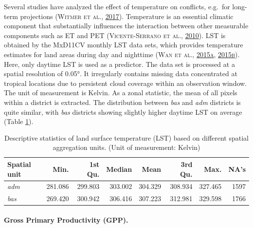 \documentclass[a4paper,11pt]{article}
\begin{document}
Several studies have analyzed the effect of temperature on conflicts, e.g.~for
long-term projections \textsc{(\textnormal{\textsc{Witmer} \textsc{et al.}}, \textnormal{\protect\hyperlink{ref-witmer2017}{2017}})}. Temperature is an essential climatic component
that substantially influences the interaction between other measurable components
such as ET and PET \textsc{(\textnormal{\textsc{Vicente-Serrano} \textsc{et al.}}, \textnormal{\protect\hyperlink{ref-vicente2010}{2010}})}. LST is obtained by the MxD11CV
monthly LST data sets, which provides temperature estimates for land areas
during day and nighttime \textsc{(\textnormal{\textsc{Wan} \textsc{et al.}}, \textnormal{\protect\hyperlink{ref-wanzhengming2015}{2015}\protect\hyperlink{ref-wanzhengming2015}{a}}, \protect\hyperlink{ref-wanzhengming2015a}{2015}\protect\hyperlink{ref-wanzhengming2015a}{b})}.
Here, only daytime LST is used as a predictor. The data set is processed at
a spatial resolution of 0.05°. It irregularly contains missing data
concentrated at tropical locations due to persistent cloud coverage within an
observation window. The unit of measurement is Kelvin.
As a zonal statistic, the mean of all pixels within a district is extracted.
The distribution between \emph{bas} and \emph{adm} districts is quite similar, with \emph{bas}
districts showing slightly higher daytime LST on average (Table \ref{tab:02-data-lst}).
\begin{table}[H]

\caption[Descriptive statistics of land surface temperature (LST).]{\label{tab:02-data-lst}Descriptive statistics of land surface temperature (LST) based on different spatial
               aggregation units. (Unit of measurement: Kelvin)}
\centering
\fontsize{10}{12}\selectfont
\begin{tabular}[t]{lrrrrrrr}
\toprule
Spatial unit & Min. & 1st Qu. & Median & Mean & 3rd Qu. & Max. & NA's\\
\midrule
\textit{adm} & 281.086 & 299.803 & 303.002 & 304.329 & 308.934 & 327.465 & 1597\\
\textit{bas} & 269.420 & 300.942 & 306.416 & 307.223 & 312.981 & 329.598 & 1766\\
\bottomrule
\end{tabular}
\end{table}
\hypertarget{gross-primary-productivity-gpp.}{%
\paragraph{Gross Primary Productivity (GPP).}\label{gross-primary-productivity-gpp.}}
\end{document}
